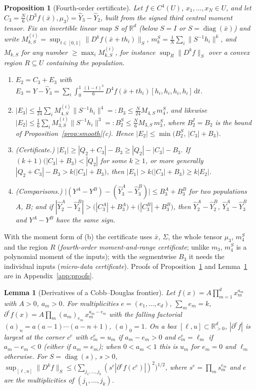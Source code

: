 \documentclass[10pt,a4paper]{article}
\theoremstyle{plain}
\newtheorem{proposition}[theorem]{Proposition}
\newtheorem{lemma}[theorem]{Lemma}
\theoremstyle{definition}
\theoremstyle{remark}
\newcommand{\R}{\mathbb{R}}
\newcommand{\dd}{\mathrm{d}}
\newcommand{\Yh}{\widehat{Y}}
\begin{document}
\begin{proposition}[Fourth-order certificate]\label{prop:sharp}
Let $f\in C^4(U)$, $x_1,\dots,x_N\in U$, and let $C_3=\frac N6\langle D^3\!f(\bar x),\mu_3\rangle=\Yh_3-\Yh_2$, built from the \emph{signed} third central moment tensor. Fix an invertible linear map $S$ of $\R^d$ (below $S=I$ or $S=\operatorname{diag}(\bar x)$) and write $M_{k,S}^{(i)}=\sup_{t\in[0,1]}\|D^k\!f(\bar x+th_i)\|_S$, $m_k^S=\frac1N\sum_i\|S^{-1}h_i\|^k$, and $M_{k,S}$ for any number $\ge\max_iM_{k,S}^{(i)}$, for instance $\sup_R\|D^k\!f\|_S$ over a convex region $R\subseteq U$ containing the population.
\begin{enumerate}[label=(\alph*),leftmargin=2em]
\item $E_2=C_3+E_3$ with $E_3=Y-\Yh_3=\sum_i\int_0^1\frac{(1-t)^3}{6}\,D^4\!f(\bar x+th_i)[h_i,h_i,h_i,h_i]\,\dd t$.
\item $|E_3|\le\frac1{24}\sum_iM_{4,S}^{(i)}\|S^{-1}h_i\|^4=:B_3\le\frac N{24}M_{4,S}\,m_4^S$, and likewise $|E_2|\le\frac16\sum_iM_{3,S}^{(i)}\|S^{-1}h_i\|^3=:B_2^S\le\frac N6M_{3,S}\,m_3^S$, where $B_2^I=B_2$ is the bound of Proposition~\ref{prop:smooth}(c). Hence $|E_2|\le\min\big(B_2^S,\,|C_3|+B_3\big)$.
\item (Certificate.) $|E_1|\ge|Q_2+C_3|-B_3\ge|Q_2|-|C_3|-B_3$. If $(k+1)\big(|C_3|+B_3\big)<|Q_2|$ for some $k\ge1$, or more generally $|Q_2+C_3|-B_3>k\big(|C_3|+B_3\big)$, then $|E_1|>k\big(|C_3|+B_3\big)\ge k|E_2|$.
\item (Comparisons.) $\big|(Y^A-Y^B)-(\Yh_3^A-\Yh_3^B)\big|\le B_3^A+B_3^B$ for two populations $A$, $B$; and if $|\Yh_2^A-\Yh_2^B|>\big(|C_3^A|+B_3^A\big)+\big(|C_3^B|+B_3^B\big)$, then $\Yh_2^A-\Yh_2^B$, $\Yh_3^A-\Yh_3^B$ and $Y^A-Y^B$ have the same sign.
\end{enumerate}
\end{proposition}

With the moment form of (b) the certificate uses $\bar x$, $\Sigma$, the whole tensor $\mu_3$, $m_4^S$ and the region $R$ (\emph{fourth-order moment-and-range certificate}; unlike $m_3$, $m_4^S$ is a polynomial moment of the inputs); with the segmentwise $B_3$ it needs the individual inputs (\emph{micro-data certificate}). Proofs of Proposition~\ref{prop:sharp} and Lemma~\ref{lem:cd4} are in Appendix~\ref{app:proofs}.

\begin{lemma}[Derivatives of a Cobb--Douglas frontier]\label{lem:cd4}
Let $f(x)=A\prod_{m=1}^dx_m^{a_m}$ with $A>0$, $a_m>0$. For multiplicities $e=(e_1,\dots,e_d)$, $\sum_me_m=k$, $\partial^e\!f(x)=A\prod_m(a_m)_{e_m}\,x_m^{a_m-e_m}$ with the falling factorial $(a)_n=a(a-1)\cdots(a-n+1)$, $(a)_0=1$. On a box $[\ell,u]\subset\R^d_{>0}$, $|\partial^e\!f|$ is largest at the corner $c^e$ with $c^e_m=u_m$ if $a_m-e_m>0$ and $c^e_m=\ell_m$ if $a_m-e_m<0$ (either if $a_m=e_m$); when $0<a_m<1$ this is $u_m$ for $e_m=0$ and $\ell_m$ otherwise. For $S=\operatorname{diag}(s)$, $s>0$, $\sup_{[\ell,u]}\|D^k\!f\|_S\le\big(\sum_{j_1,\dots,j_k}(s^e|\partial^e\!f(c^e)|)^2\big)^{1/2}$, where $s^e=\prod_ms_m^{e_m}$ and $e$ are the multiplicities of $(j_1,\dots,j_k)$.
\end{lemma}
\end{document}
